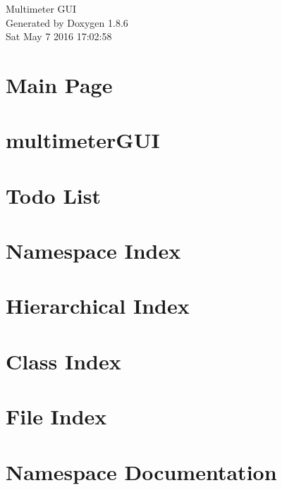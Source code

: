 \documentclass[twoside]{book}
\newcommand{\clearemptydoublepage}{%
  \newpage{\pagestyle{empty}\cleardoublepage}%
}
\begin{document}
\hypersetup{pageanchor=false}
\begin{titlepage}
\vspace*{7cm}
\begin{center}%
{\Large Multimeter G\-U\-I }\\
\vspace*{1cm}
{\large Generated by Doxygen 1.8.6}\\
\vspace*{0.5cm}
{\small Sat May 7 2016 17:02:58}\\
\end{center}
\end{titlepage}
\clearemptydoublepage
\tableofcontents
\clearemptydoublepage
{}
\hypersetup{pageanchor=true}

\chapter{Main Page}
\label{index}\hypertarget{index}{}
\chapter{multimeter\-G\-U\-I}
\label{md__r_e_a_d_m_e}
\hypertarget{md__r_e_a_d_m_e}{}

\chapter{Todo List}
\label{todo}
\hypertarget{todo}{}

\chapter{Namespace Index}

\chapter{Hierarchical Index}

\chapter{Class Index}

\chapter{File Index}

\chapter{Namespace Documentation}

\end{document}
